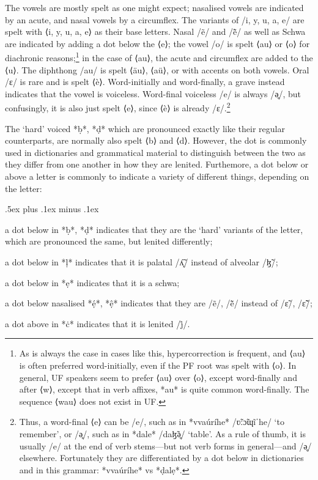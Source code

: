 \documentclass[a4paper, 12pt, oneside, final]{article}
\begin{document}
The vowels are mostly spelt as one might expect; nasalised vowels are indicated by an acute, and nasal vowels by a circumflex.
The variants of /i, y, u, a, e/ are spelt with ⟨i, y, u, a, e⟩ as their base letters. Nasal /ẽ/ and /ẽ̃/ as well as Schwa are
indicated by adding a dot below the ⟨e⟩; the vowel /o/ is spelt ⟨au⟩ or ⟨o⟩ for diachronic reasons;\footnote{As is always the
case in cases like this, hypercorrection is frequent, and ⟨au⟩ is often preferred word-initially, even if the
PF root was spelt with ⟨o⟩. In general, UF speakers seem to prefer ⟨au⟩ over ⟨o⟩, except word-finally and after ⟨w⟩, except
that in verb affixes, *au* is quite common word-finally. The sequence ⟨wau⟩ does not exist in UF.} in the case of
⟨au⟩, the acute and circumflex are added to the ⟨u⟩. The diphthong /au/ is spelt ⟨äu⟩, ⟨aü⟩, or with accents on both vowels. Oral
/ɛ/ is rare and is spelt ⟨è⟩. Word-initially and word-finally, a grave instead indicates that the vowel is voiceless. Word-final
voiceless /e/ is always /ə̥/, but confusingly, it is also just spelt ⟨e⟩, since ⟨è⟩ is already /ɛ/.\footnote{Thus, a word-final ⟨e⟩
can be /e/, such as in *vvaúríhe* /ʋ̃ːɔ̃ɰĩˈhe/ ‘to remember’, or /ə̥/, such as in *dale* /daɮ̃ə̥/ ‘table’. As a rule of thumb, it is
usually /e/ at the end of verb stems—but not verb forms in general—and /ə̥/ elsewhere. Fortunately they are differentiated by a
dot below in dictionaries and in this grammar: *vvaúríhe* vs *ḍalẹ*.}

The ‘hard’ voiced *ḅ*, *ḍ* which are pronounced exactly like their regular counterparts, are normally also spelt ⟨b⟩ and
⟨d⟩. However, the dot is commonly used in dictionaries and grammatical material to distinguish between the two
as they differ from one another in how they are lenited. Furthemore, a dot below or above a letter is commonly to indicate
a variety of different things, depending on the letter:
\begin{items}\itemsep .5ex plus .1ex minus .1ex\relax
\item a dot below in *ḅ*, *ḍ* indicates that they are the ‘hard’ variants of the letter, which are pronounced
      the same, but lenited differently;
\item a dot below in *ḷ* indicates that it is palatal /ʎ̝̃/ instead of alveolar /ɮ̃/;
\item a dot below in *ẹ* indicates that it is a schwa;
\item a dot below nasalised *ẹ́*, *ệ* indicates that they are /ẽ/, /ẽ̃/ instead of /ɛ̃/, /ɛ̃̃/;
\item a dot above in *ċ* indicates that it is lenited /j̊/.
\end{items}
\end{document}
